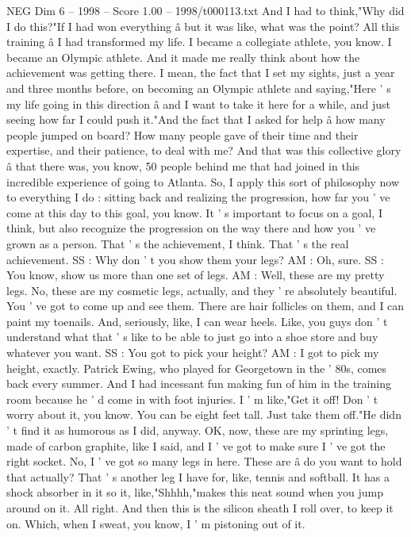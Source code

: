 \begin{textsample}{NEG Dim 6 – 1998 – Score 1.00 – 1998/t000113.txt}
And I had to think,"Why did I do this?"If I had won everything â but it was like, what was the point?
All this training â I had transformed my life.
I became a collegiate athlete, you know.
I became an Olympic athlete.
And it made me really think about how the achievement was getting there.
I mean, the fact that I set my sights, just a year and three months before, on becoming an Olympic athlete and saying,"Here ' s my life going in this direction â and I want to take it here for a while, and just seeing how far I could push it."And the fact that I asked for help â how many people jumped on board?
How many people gave of their time and their expertise, and their patience, to deal with me?
And that was this collective glory â that there was, you know, 50 people behind me that had joined in this incredible experience of going to Atlanta.
So, I apply this sort of philosophy now to everything I do : sitting back and realizing the progression, how far you ' ve come at this day to this goal, you know.
It ' s important to focus on a goal, I think, but also recognize the progression on the way there and how you ' ve grown as a person.
That ' s the achievement, I think.
That ' s the real achievement.
SS : Why don ' t you show them your legs?
AM : Oh, sure.
SS : You know, show us more than one set of legs.
AM : Well, these are my pretty legs.
No, these are my cosmetic legs, actually, and they ' re absolutely beautiful.
You ' ve got to come up and see them.
There are hair follicles on them, and I can paint my toenails.
And, seriously, like, I can wear heels.
Like, you guys don ' t understand what that ' s like to be able to just go into a shoe store and buy whatever you want.
SS : You got to pick your height?
AM : I got to pick my height, exactly.
Patrick Ewing, who played for Georgetown in the ' 80s, comes back every summer.
And I had incessant fun making fun of him in the training room because he ' d come in with foot injuries.
I ' m like,"Get it off!
Don ' t worry about it, you know.
You can be eight feet tall.
Just take them off."He didn ' t find it as humorous as I did, anyway.
OK, now, these are my sprinting legs, made of carbon graphite, like I said, and I ' ve got to make sure I ' ve got the right socket.
No, I ' ve got so many legs in here.
These are â do you want to hold that actually?
That ' s another leg I have for, like, tennis and softball.
It has a shock absorber in it so it, like,"Shhhh,"makes this neat sound when you jump around on it.
All right.
And then this is the silicon sheath I roll over, to keep it on.
Which, when I sweat, you know, I ' m pistoning out of it.

\end{textsample}
